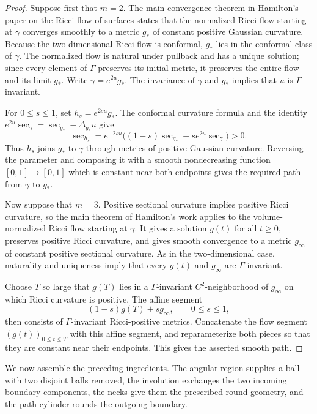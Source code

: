 \documentclass[11pt,reqno]{amsart}
\theoremstyle{definition}
\numberwithin{equation}{section}
\begin{document}
\begin{proof}
Suppose first that $m=2$.  The main convergence theorem in Hamilton's
paper on the Ricci flow of surfaces \cite{Hamilton1988Surfaces} states
that the normalized Ricci flow starting at $\gamma$ converges smoothly
to a metric $g_*$ of constant positive Gaussian curvature.  Because the
two-dimensional Ricci flow is conformal, $g_*$ lies in the conformal
class of $\gamma$.  The normalized flow is
natural under pullback and has a unique solution; since every element of
$\Gamma$ preserves its initial metric, it preserves the entire flow and its
limit $g_*$.  Write $\gamma=e^{2u}g_*$.  The invariance of $\gamma$ and
$g_*$ implies that $u$ is $\Gamma$-invariant.

For $0\le s\le1$, set $h_s=e^{2su}g_*$.  The conformal curvature
formula and the identity
$e^{2u}\sec_\gamma=\sec_{g_*}-\Delta_{g_*}u$ give
\begin{equation}
\sec_{h_s}=e^{-2su}\bigl((1-s)\sec_{g_*}
                         +s e^{2u}\sec_\gamma\bigr)>0.           \label{eq:unified-base-3-71}
\end{equation}
Thus $h_s$ joins $g_*$ to $\gamma$ through metrics of positive Gaussian
curvature.  Reversing the parameter and composing it with a smooth
nondecreasing function $[0,1]\to[0,1]$ which is constant near both
endpoints gives the required path from $\gamma$ to $g_*$.

Now suppose that $m=3$.  Positive sectional curvature implies positive
Ricci curvature, so the main theorem of Hamilton's work
\cite{Hamilton1982} applies to the volume-normalized Ricci flow starting
at $\gamma$.  It gives a solution $g(t)$ for all $t\ge0$, preserves
positive Ricci curvature, and gives smooth convergence to a metric
$g_\infty$ of constant positive sectional curvature.  As in the
two-dimensional case, naturality and uniqueness imply that every
$g(t)$ and $g_\infty$ are $\Gamma$-invariant.

Choose $T$ so large that $g(T)$ lies in a $\Gamma$-invariant
$C^2$-neighborhood of $g_\infty$ on which Ricci curvature is positive.
The affine segment
\[
 (1-s)g(T)+s g_\infty,\qquad 0\le s\le1,
\]
then consists of $\Gamma$-invariant Ricci-positive metrics.  Concatenate the
flow segment $(g(t))_{0\le t\le T}$ with this affine segment, and
reparameterize both pieces so that they are constant near their
endpoints.  This gives the asserted smooth path.
\end{proof}

We now assemble the preceding ingredients.  The angular region supplies
a ball with two disjoint balls removed, the involution exchanges the two
incoming boundary components, the necks give them the prescribed round
geometry, and the path cylinder rounds the outgoing boundary.
\end{document}
